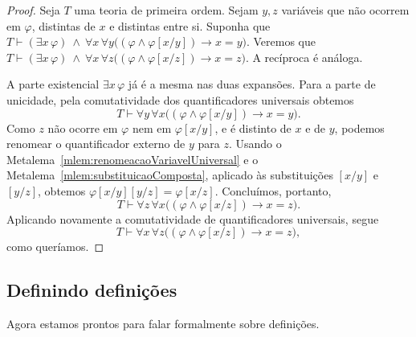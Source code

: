 \begin{proof}
    Seja $T$ uma teoria de primeira ordem.
    Sejam $y, z$ variáveis que não ocorrem em $\varphi$, distintas de $x$ e distintas entre si.
    Suponha que $T\vdash (\exists x\,\varphi)\ \wedge\ \forall x\,\forall y\bigl((\varphi \wedge \varphi[x/y])\rightarrow x=y\bigr)$.
    Veremos que $T\vdash (\exists x\,\varphi)\ \wedge\ \forall x\,\forall z\bigl((\varphi \wedge \varphi[x/z])\rightarrow x=z\bigr)$.
    A recíproca é análoga.

    A parte existencial $\exists x\,\varphi$ já é a mesma nas duas expansões.
    Para a parte de unicidade, pela comutatividade dos quantificadores universais obtemos
    \[
        T\vdash \forall y\,\forall x\bigl((\varphi \wedge \varphi[x/y])\rightarrow x=y\bigr).
    \]
    Como $z$ não ocorre em $\varphi$ nem em $\varphi[x/y]$, e é distinto de $x$ e de $y$, podemos renomear o quantificador externo de $y$ para $z$.
    Usando o Metalema~\ref{mlem:renomeacaoVariavelUniversal} e o
    Metalema~\ref{mlem:substituicaoComposta}, aplicado às substituições
    $[x/y]$ e $[y/z]$, obtemos
    $\varphi[x/y][y/z]=\varphi[x/z]$.
    Concluímos, portanto,
    \[
        T\vdash \forall z\,\forall x\bigl((\varphi \wedge \varphi[x/z])\rightarrow x=z\bigr).
    \]
    Aplicando novamente a comutatividade de quantificadores universais, segue
    \[
        T\vdash \forall x\,\forall z\bigl((\varphi \wedge \varphi[x/z])\rightarrow x=z\bigr),
    \]
    como queríamos.
\end{proof}

\subsection{Definindo definições}\label{subsec:definindoDefinicoes}
Agora estamos prontos para falar formalmente sobre definições.

